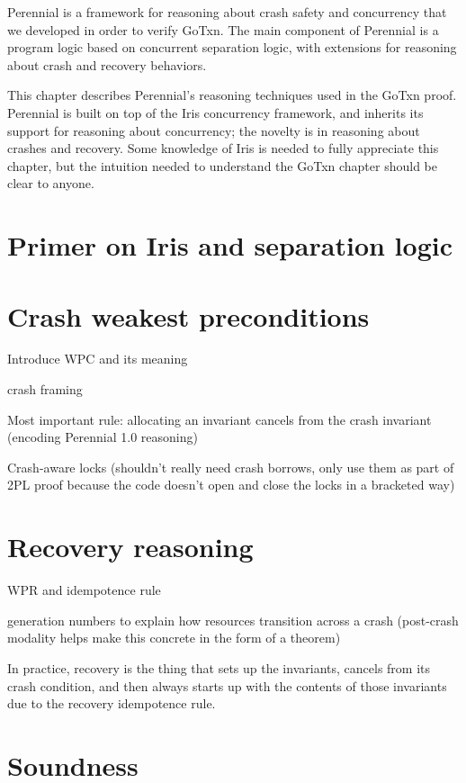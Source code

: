 Perennial is a framework for reasoning about crash safety and concurrency that
we developed in order to verify GoTxn. The main component of Perennial is a
program logic based on concurrent separation logic, with extensions for
reasoning about crash and recovery behaviors.

This chapter describes Perennial's reasoning techniques used in the GoTxn proof.
Perennial is built on top of the Iris concurrency framework, and inherits its
support for reasoning about concurrency; the novelty is in reasoning about
crashes and recovery. Some knowledge of Iris is needed to fully appreciate this
chapter, but the intuition needed to understand the GoTxn chapter should be
clear to anyone.

\section{Primer on Iris and separation logic}



\section{Crash weakest preconditions}

Introduce WPC and its meaning

crash framing

Most important rule: allocating an invariant cancels from the crash invariant
(encoding Perennial 1.0 reasoning)

Crash-aware locks (shouldn't really need crash borrows, only use them as part of
2PL proof because the code doesn't open and close the locks in a bracketed way)

\section{Recovery reasoning}

WPR and idempotence rule

generation numbers to explain how resources transition across a crash
(post-crash modality helps make this concrete in the form of a theorem)

In practice, recovery is the thing that sets up the invariants, cancels from its
crash condition, and then always starts up with the contents of those
invariants due to the recovery idempotence rule.

\section{Soundness}

